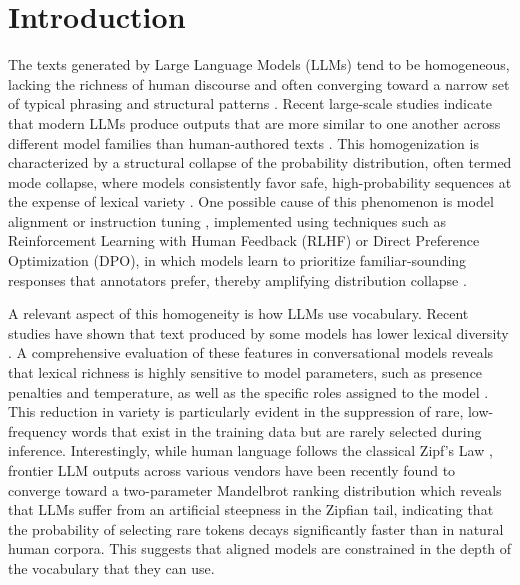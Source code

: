 \documentclass{article}
\begin{document}



\section{Introduction}
\label{sec:introduction}

The texts generated by Large Language Models (LLMs) tend to be homogeneous, lacking the richness of human discourse and often converging toward a narrow set of typical phrasing and structural patterns \cite{jiang2025hivemind}. Recent large-scale studies indicate that modern LLMs produce outputs that are more similar to one another across different model families than human-authored texts \cite{LLMhomogeneity}. This homogenization is characterized by a structural collapse of the probability distribution, often termed mode collapse, where models consistently favor safe, high-probability sequences at the expense of lexical variety \cite{LLMcreativity}. One possible cause of this phenomenon is model alignment or instruction tuning \cite{zhang2026instruction}, implemented using techniques such as Reinforcement Learning with Human Feedback (RLHF) or Direct Preference Optimization (DPO), in which models learn to prioritize familiar-sounding responses that annotators prefer, thereby amplifying distribution collapse \cite{LLMdiversity, FormatCollapse, liu2026alignment}.

A relevant aspect of this homogeneity is how LLMs use vocabulary. Recent studies have shown that text produced by some models has lower lexical diversity \cite{fredrick2025lexical}. A comprehensive evaluation of these features in conversational models reveals that lexical richness is highly sensitive to model parameters, such as presence penalties and temperature, as well as the specific roles assigned to the model \cite{martinez2025beware}. This reduction in variety is particularly evident in the suppression of rare, low-frequency words that exist in the training data but are rarely selected during inference. Interestingly, while human language follows the classical Zipf’s Law \cite{zipf2016human}, frontier LLM outputs across various vendors have been recently found to converge toward a two-parameter Mandelbrot ranking distribution \cite{Mandlebrot} which reveals that LLMs suffer from an artificial steepness in the Zipfian tail, indicating that the probability of selecting rare tokens decays significantly faster than in natural human corpora. This suggests that aligned models are constrained in the depth of the vocabulary that they can use.
\end{document}

